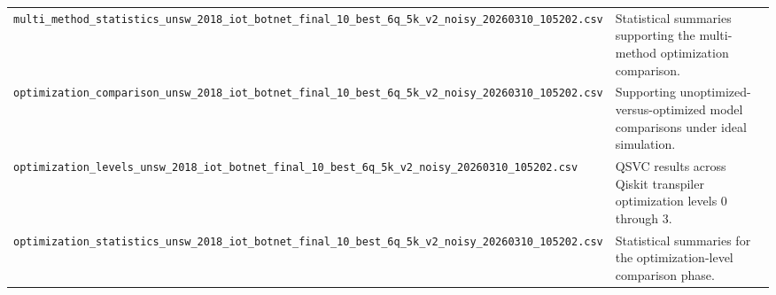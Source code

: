\documentclass{ieeeaccess}
\begin{document}
\begin{table}[t]
{\begin{tabular}{|l|p{}|}
\texttt{multi\_method\_statistics\_unsw\_2018\_iot\_botnet\_final\_10\_best\_6q\_5k\_v2\_noisy\_20260310\_105202.csv} & Statistical summaries supporting the multi-method optimization comparison. \\
\texttt{optimization\_comparison\_unsw\_2018\_iot\_botnet\_final\_10\_best\_6q\_5k\_v2\_noisy\_20260310\_105202.csv} & Supporting unoptimized-versus-optimized model comparisons under ideal simulation. \\
\texttt{optimization\_levels\_unsw\_2018\_iot\_botnet\_final\_10\_best\_6q\_5k\_v2\_noisy\_20260310\_105202.csv} & QSVC results across Qiskit transpiler optimization levels 0 through 3. \\
\texttt{optimization\_statistics\_unsw\_2018\_iot\_botnet\_final\_10\_best\_6q\_5k\_v2\_noisy\_20260310\_105202.csv} & Statistical summaries for the optimization-level comparison phase. \\
\hline
\end{tabular}%
}
\end{table}
\end{document}
